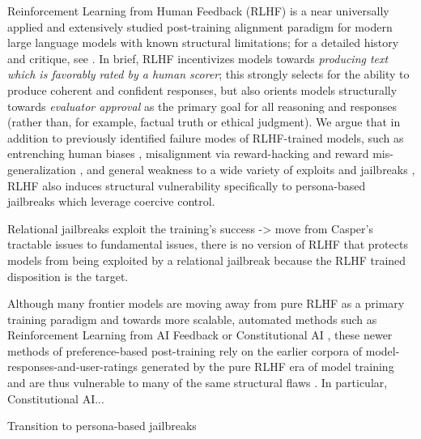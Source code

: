 Reinforcement Learning from Human Feedback (RLHF) is a near universally applied \cite{openai_gpt-4_2023, anthropic_introducing_2023, google_bard_2023, touvron_llama_2023, google_deepmind_gemini_2026, spacexai_introducing_2026} and extensively studied post-training alignment paradigm for modern large language models with known structural limitations; for a detailed history and critique, see \citet{casper_open_2023}. In brief, RLHF incentivizes models towards \textit{producing text which is favorably rated by a human scorer}; this strongly selects for the ability to produce coherent and confident responses, but also orients models structurally towards \textit{evaluator approval} as the primary goal for all reasoning and responses (rather than, for example, factual truth or ethical judgment). We argue that in addition to previously identified failure modes of RLHF-trained models, such as entrenching human biases \cite{bender_dangers_2021}, misalignment via reward-hacking and reward mis-generalization \cite{skalse_defining_nodate, wang_reward_2026}, and general weakness to a wide variety of exploits and jailbreaks \cite{wei_jailbroken_2023}, RLHF also induces structural vulnerability specifically to persona-based jailbreaks which leverage coercive control.

Relational jailbreaks exploit the training's success -> move from Casper's tractable issues to fundamental issues, there is no version of RLHF that protects models from being exploited by a relational jailbreak because the RLHF trained disposition is the target.  


Although many frontier models are moving away from pure RLHF as a primary training paradigm and towards more scalable, automated methods such as Reinforcement Learning from AI Feedback or Constitutional AI \cite{anthropic_system_2026-1, anthropic_system_2026-2, openai_gpt-6_2026, deepseek-ai_deepseek-v41-flash_2026, qwen_team_qwen38-max_2026}, these newer methods of preference-based post-training rely on the earlier corpora of model-responses-and-user-ratings generated by the pure RLHF era of model training and are thus vulnerable to many of the same structural flaws \cite{bai_constitutional_2022, lee_rlaif_2024, srivastava_technical_2026}. In particular, Constitutional AI...

Transition to persona-based jailbreaks


